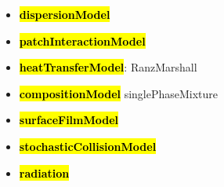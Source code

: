 \documentclass[12pt]{article}
\begin{document}
\begin{itemize}
\item \textbf{\hl{dispersionModel}}
\item \textbf{\hl{patchInteractionModel}}
\item \textbf{\hl{heatTransferModel}}: RanzMarshall
\item \textbf{\hl{compositionModel}} singlePhaseMixture
\item \textbf{\hl{surfaceFilmModel}}
\item \textbf{\hl{stochasticCollisionModel}}
\item \textbf{\hl{radiation}}
\end{itemize}
\end{document}
